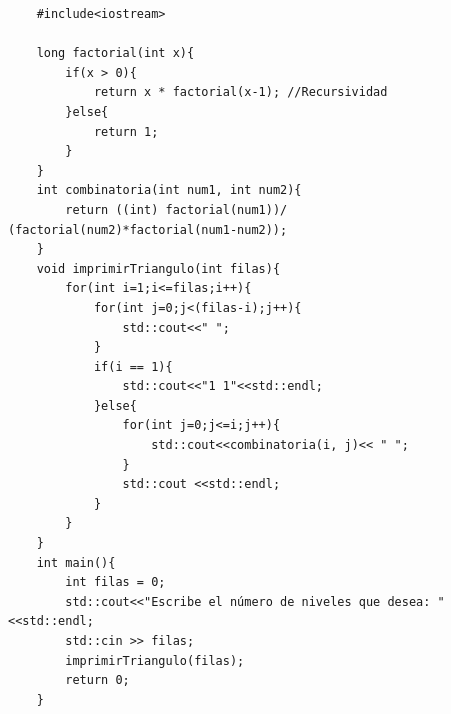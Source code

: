 \begin{verbatim}
    #include<iostream>
    
    long factorial(int x){
    	if(x > 0){
    		return x * factorial(x-1); //Recursividad
    	}else{
    		return 1;
    	}
    }
    int combinatoria(int num1, int num2){
    	return ((int) factorial(num1))/ (factorial(num2)*factorial(num1-num2));
    }
    void imprimirTriangulo(int filas){
    	for(int i=1;i<=filas;i++){
    		for(int j=0;j<(filas-i);j++){
    			std::cout<<" ";
    		}
    		if(i == 1){
    			std::cout<<"1 1"<<std::endl;
    		}else{
    			for(int j=0;j<=i;j++){
    				std::cout<<combinatoria(i, j)<< " ";
    			}
    			std::cout <<std::endl;
    		}
    	}
    }
    int main(){
    	int filas = 0;
    	std::cout<<"Escribe el número de niveles que desea: "<<std::endl;
    	std::cin >> filas;
    	imprimirTriangulo(filas);
        return 0;
    }
    
\end{verbatim}






